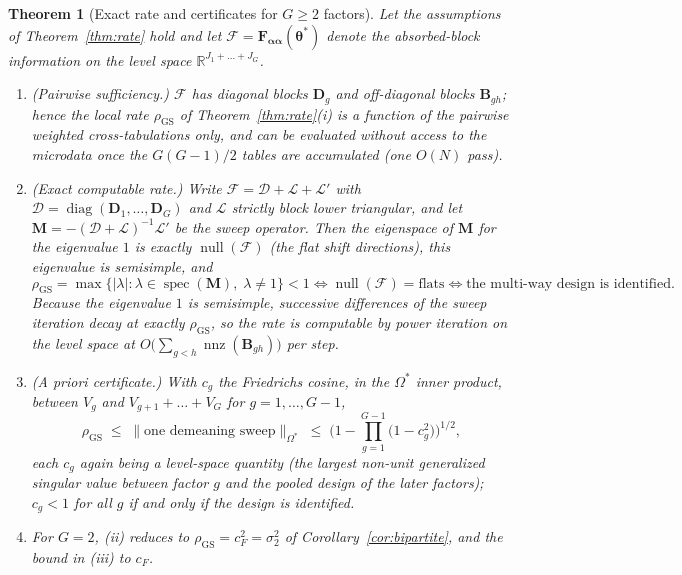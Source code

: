 \documentclass[11pt]{article}
\newtheorem{theorem}{Theorem}
\newcommand{\R}{\mathbb{R}}
\newcommand{\diag}{\operatorname{diag}}
\newcommand{\btheta}{\bm{\theta}}
\newcommand{\balpha}{\bm{\alpha}}
\newcommand{\bF}{\mathbf{F}}
\newcommand{\bB}{\mathbf{B}}
\newcommand{\bD}{\mathbf{D}}
\begin{document}
\begin{theorem}[Exact rate and certificates for $G \ge 2$ factors]
\label{thm:multiG}
Let the assumptions of Theorem~\ref{thm:rate} hold and let
$\mathcal{F} = \bF_{\balpha\balpha}(\btheta^\ast)$ denote the absorbed-block
information on the level space $\R^{J_1 + \dots + J_G}$.
\begin{enumerate}
\item[(i)] \emph{(Pairwise sufficiency.)}  $\mathcal{F}$ has diagonal
blocks $\bD_g$ and off-diagonal blocks $\bB_{gh}$; hence the local rate
$\rho_{\mathrm{GS}}$ of Theorem~\ref{thm:rate}(i) is a function of the
pairwise weighted cross-tabulations only, and can be evaluated without
access to the microdata once the $G(G-1)/2$ tables are accumulated (one
$O(N)$ pass).
\item[(ii)] \emph{(Exact computable rate.)}  Write $\mathcal{F} =
\mathcal{D} + \mathcal{L} + \mathcal{L}'$ with $\mathcal{D} =
\diag(\bD_1, \dots, \bD_G)$ and $\mathcal{L}$ strictly block lower
triangular, and let $\mathbf{M} = -(\mathcal{D} +
\mathcal{L})^{-1}\mathcal{L}'$ be the sweep operator.  Then the
eigenspace of $\mathbf{M}$ for the eigenvalue $1$ is exactly
$\operatorname{null}(\mathcal{F})$ (the flat shift directions), this
eigenvalue is semisimple, and
\[
\rho_{\mathrm{GS}}
 = \max\big\{ |\lambda| : \lambda \in \operatorname{spec}(\mathbf{M}),\;
   \lambda \ne 1 \big\} < 1
 \iff \operatorname{null}(\mathcal{F}) = \text{flats}
 \iff \text{the multi-way design is identified}.
\]
Because the eigenvalue $1$ is semisimple, successive differences of the
sweep iteration decay at exactly $\rho_{\mathrm{GS}}$, so the rate is
computable by power iteration on the level space at
$O\big(\sum_{g<h} \operatorname{nnz}(\bB_{gh})\big)$ per step.
\item[(iii)] \emph{(A priori certificate.)}  With $c_g$ the Friedrichs
cosine, in the $\Omega^\ast$ inner product, between $V_g$ and
$V_{g+1} + \dots + V_G$ for $g = 1, \dots, G-1$,
\[
\rho_{\mathrm{GS}}
 \;\le\; \big\| \text{one demeaning sweep} \big\|_{\Omega^\ast}
 \;\le\; \Big( 1 - \prod_{g=1}^{G-1} \big(1 - c_g^2\big) \Big)^{1/2},
\]
each $c_g$ again being a level-space quantity (the largest
non-unit generalized singular value between factor $g$ and the pooled
design of the later factors); $c_g < 1$ for all $g$ if and only if the
design is identified.
\item[(iv)] For $G = 2$, (ii) reduces to $\rho_{\mathrm{GS}} =
c_F^2 = \sigma_2^2$ of Corollary~\ref{cor:bipartite}, and the bound in
(iii) to $c_F$.
\end{enumerate}
\end{theorem}
\end{document}
